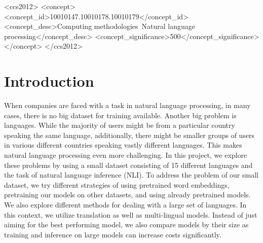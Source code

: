 \documentclass[acmsmall,nonacm]{acmart}
\begin{document}
\begin{CCSXML}
<ccs2012>
   <concept>
       <concept_id>10010147.10010178.10010179</concept_id>
       <concept_desc>Computing methodologies~Natural language processing</concept_desc>
       <concept_significance>500</concept_significance>
       </concept>
 </ccs2012>
\end{CCSXML}



\maketitle

\tableofcontents


\section{Introduction}
When companies are faced with a task in natural language processing, in many cases, there is no big dataset for training available. Another big problem is languages. 
While the majority of users might be from a particular country speaking the same language, additionally, there might be smaller groups of users in various different countries speaking vastly different languages.
This makes natural language processing even more challenging.
In this project, we explore these problems by using a small dataset consisting of 15 different languages and the task of natural language inference (NLI). To address the problem of our small dataset, we try different strategies of using pretrained word embeddings, pretraining our models on other datasets, and using already pretrained models. We also explore different methods for dealing with a large set of languages. In this context, we utilize translation as well as multi-lingual models. Instead of just aiming for the best performing model, we also compare models by their size as training and inference on large models can increase costs significantly.  
\end{document}
